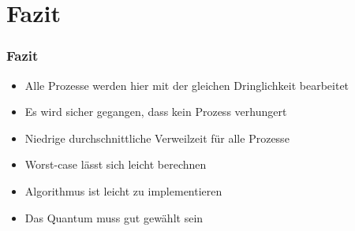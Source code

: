 \section{Fazit}

\begin{frame}
    \frametitle{Fazit}

    \begin{itemize}
        \item Alle Prozesse werden hier mit der gleichen Dringlichkeit bearbeitet
        \item Es wird sicher gegangen, dass kein Prozess verhungert
        \item Niedrige durchschnittliche Verweilzeit für alle Prozesse
        \item Worst-case lässt sich leicht berechnen
        \item Algorithmus ist leicht zu implementieren
        \item Das Quantum muss gut gewählt sein
    \end{itemize}

\end{frame}
